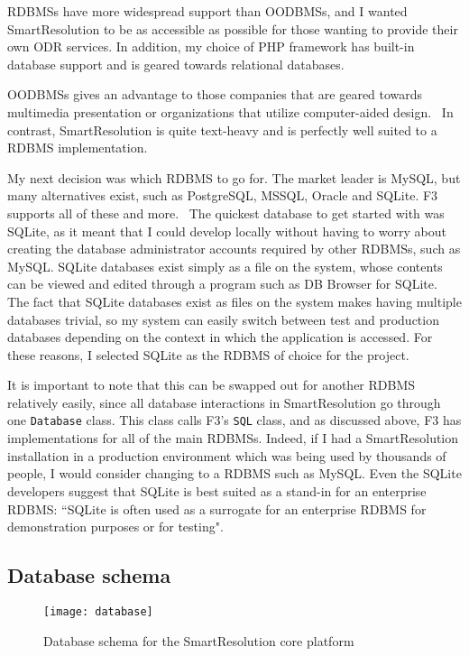 RDBMSs have more widespread support than OODBMSs, and I wanted SmartResolution to be as accessible as possible for those wanting to provide their own ODR services. In addition, my choice of PHP framework has built-in database support and is geared towards relational databases.

OODBMSs gives an advantage to those companies that are geared towards multimedia presentation or organizations that utilize computer-aided design.~\cite{oodbms} In contrast, SmartResolution is quite text-heavy and is perfectly well suited to a RDBMS implementation.

My next decision was which RDBMS to go for. The market leader is MySQL, but many alternatives exist, such as PostgreSQL, MSSQL, Oracle and SQLite. F3 supports all of these and more.~\cite{f3:sqlConstructor} The quickest database to get started with was SQLite, as it meant that I could develop locally without having to worry about creating the database administrator accounts required by other RDBMSs, such as MySQL. SQLite databases exist simply as a file on the system, whose contents can be viewed and edited through a program such as DB Browser for SQLite. The fact that SQLite databases exist as files on the system makes having multiple databases trivial, so my system can easily switch between test and production databases depending on the context in which the application is accessed. For these reasons, I selected SQLite as the RDBMS of choice for the project.

It is important to note that this can be swapped out for another RDBMS relatively easily, since all database interactions in SmartResolution go through one \lstinline{Database} class. This class calls F3's \lstinline{SQL} class, and as discussed above, F3 has implementations for all of the main RDBMSs. Indeed, if I had a SmartResolution installation in a production environment which was being used by thousands of people, I would consider changing to a RDBMS such as MySQL. Even the SQLite developers suggest that SQLite is best suited as a stand-in for an enterprise RDBMS: ``SQLite is often used as a surrogate for an enterprise RDBMS for demonstration purposes or for testing".~\cite{sqliteFeatures}

\subsection{Database schema}

\begin{figure}[h!]
  \centering
    \ifimages
    \texttt{[image: database]}
    \fi
  \caption{Database schema for the SmartResolution core platform}
  \label{uml:databaseSchema}
\end{figure}

